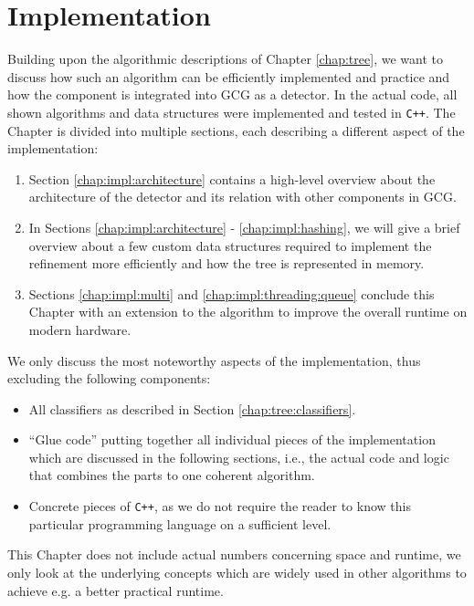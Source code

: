 \chapter{Implementation}
\label{chap:impl}

	Building upon the algorithmic descriptions of Chapter \ref{chap:tree}, we want to discuss how such an algorithm can be efficiently implemented and practice and how the component is integrated into \ac{GCG} as a detector. In the actual code, all shown algorithms and data structures were implemented and tested in \lstinline|C++|.
	The Chapter is divided into multiple sections, each describing a different aspect of the implementation:

	\begin{enumerate}
		\item Section \ref{chap:impl:architecture} contains a high-level overview about the architecture of the detector and its relation with other components in \ac{GCG}.
		\item In Sections \ref{chap:impl:architecture} - \ref{chap:impl:hashing}, we will give a brief overview about a few custom data structures required to implement the refinement more efficiently and how the tree is represented in memory.
		\item Sections \ref{chap:impl:multi} and \ref{chap:impl:threading:queue} conclude this Chapter with an extension to the algorithm to improve the overall runtime on modern hardware.
	\end{enumerate}

	We only discuss the most noteworthy aspects of the implementation, thus excluding the following components:

	\begin{itemize}
		\item All classifiers as described in Section \ref{chap:tree:classifiers}.
		\item \enquote{Glue code} putting together all individual pieces of the implementation which are discussed in the following sections, i.e., the actual code and logic that combines the parts to one coherent algorithm.
		\item Concrete pieces of \lstinline|C++|, as we do not require the reader to know this particular programming language on a sufficient level.
	\end{itemize}

	This Chapter does not include actual numbers concerning space and runtime, we only look at the underlying concepts which are widely used in other algorithms to achieve e.g. a better practical runtime.


